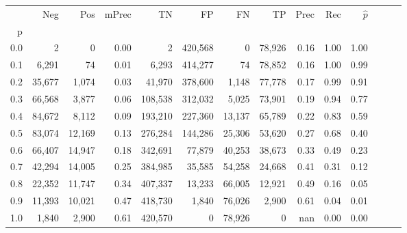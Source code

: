 \begin{tabular}{rrrrrrrrrrrrrr}
\toprule
{} &     Neg &     Pos & mPrec &       TN &       FP &      FN &      TP &  Prec &   Rec & $\hat{p}$ \\
p   &         &         &       &          &          &         &         &       &       &           \\
\midrule
0.0 &       2 &       0 &  0.00 &        2 &  420,568 &       0 &  78,926 &  0.16 &  1.00 &      1.00 \\
0.1 &   6,291 &      74 &  0.01 &    6,293 &  414,277 &      74 &  78,852 &  0.16 &  1.00 &      0.99 \\
0.2 &  35,677 &   1,074 &  0.03 &   41,970 &  378,600 &   1,148 &  77,778 &  0.17 &  0.99 &      0.91 \\
0.3 &  66,568 &   3,877 &  0.06 &  108,538 &  312,032 &   5,025 &  73,901 &  0.19 &  0.94 &      0.77 \\
0.4 &  84,672 &   8,112 &  0.09 &  193,210 &  227,360 &  13,137 &  65,789 &  0.22 &  0.83 &      0.59 \\
0.5 &  83,074 &  12,169 &  0.13 &  276,284 &  144,286 &  25,306 &  53,620 &  0.27 &  0.68 &      0.40 \\
0.6 &  66,407 &  14,947 &  0.18 &  342,691 &   77,879 &  40,253 &  38,673 &  0.33 &  0.49 &      0.23 \\
0.7 &  42,294 &  14,005 &  0.25 &  384,985 &   35,585 &  54,258 &  24,668 &  0.41 &  0.31 &      0.12 \\
0.8 &  22,352 &  11,747 &  0.34 &  407,337 &   13,233 &  66,005 &  12,921 &  0.49 &  0.16 &      0.05 \\
0.9 &  11,393 &  10,021 &  0.47 &  418,730 &    1,840 &  76,026 &   2,900 &  0.61 &  0.04 &      0.01 \\
1.0 &   1,840 &   2,900 &  0.61 &  420,570 &        0 &  78,926 &       0 &   nan &  0.00 &      0.00 \\
\bottomrule
\end{tabular}
